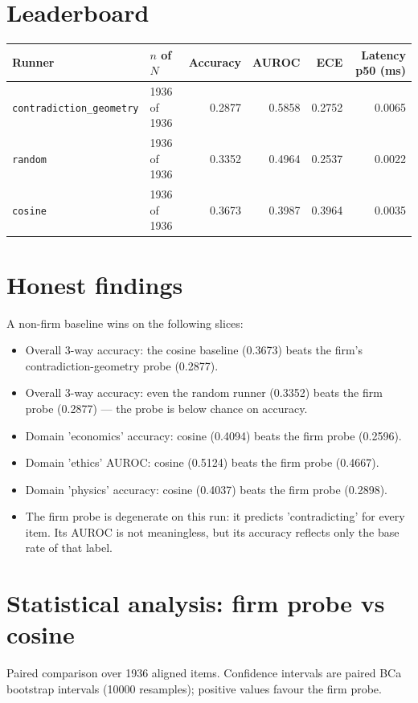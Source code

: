 \documentclass[11pt]{article}
\begin{document}
\section{Leaderboard}
\begin{longtable}{l l r r r r}
\toprule
Runner & $n$ of $N$ & Accuracy & AUROC & ECE & Latency p50 (ms) \\
\midrule
\texttt{contradiction\_geometry} & 1936 of 1936 & 0.2877 & 0.5858 & 0.2752 & 0.0065 \\
\texttt{random} & 1936 of 1936 & 0.3352 & 0.4964 & 0.2537 & 0.0022 \\
\texttt{cosine} & 1936 of 1936 & 0.3673 & 0.3987 & 0.3964 & 0.0035 \\
\bottomrule
\end{longtable}

\section{Honest findings}\label{sec:honest}
A non-firm baseline wins on the following slices:
\begin{itemize}
\item Overall 3-way accuracy: the cosine baseline (0.3673) beats the firm's contradiction-geometry probe (0.2877).
\item Overall 3-way accuracy: even the random runner (0.3352) beats the firm probe (0.2877) --- the probe is below chance on accuracy.
\item Domain 'economics' accuracy: cosine (0.4094) beats the firm probe (0.2596).
\item Domain 'ethics' AUROC: cosine (0.5124) beats the firm probe (0.4667).
\item Domain 'physics' accuracy: cosine (0.4037) beats the firm probe (0.2898).
\item The firm probe is degenerate on this run: it predicts 'contradicting' for every item. Its AUROC is not meaningless, but its accuracy reflects only the base rate of that label.
\end{itemize}

\section{Statistical analysis: firm probe vs cosine}
Paired comparison over 1936 aligned items. Confidence intervals are paired BCa bootstrap intervals (10000 resamples); positive values favour the firm probe.
\end{document}
